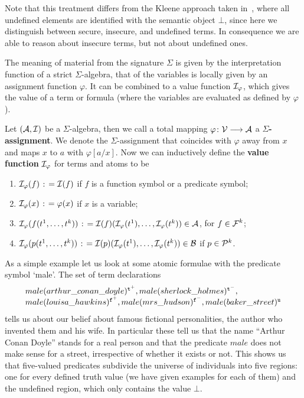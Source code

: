 \documentclass{\filespath jancl}
\def\Vars{{\cV}}                      %
\def\Funcs{{\mbox{$\cF$}}}
\def\to{\longrightarrow}
\def\deq{{\;\colon\kern-.2em=\;}}
\def\phi{\varphi}
\def\cA{{\cal A}}\def\cB{{\cal B}}\def\cC{{\cal C}}
\def\cV{{\cal V}}\def\cW{{\cal W}}\def\cX{{\cal X}}
\let\phi\varphi
\newcommand{\undefined}{{\sf u}}
\newcommand{\twts}{{{\sf t}^+}}
\newcommand{\twfs}{{{\sf f}^+}}
\newcommand{\twti}{{{\sf t}^-}}
\newcommand{\twfi}{{{\sf f}^-}}
\newcommand{\Tval}{{\cal B}}
\def\Preds{{\cal P}}
\def\sf{\tt}
\begin{document}
  Note that this treatment differs from the Kleene approach taken
  in~\cite{KeKo94}, where all undefined elements are identified
  with the semantic object $\bot$, since here we distinguish between
  secure, insecure, and undefined terms.  In consequence we are able
  to reason about insecure terms, but not about undefined ones.

The meaning of material from the signature $\Sigma$ is given by the
interpretation function of a strict $\Sigma$-algebra, that of the variables is
locally given by an assignment function $\phi$. It can be combined to
a value function $\cI_{\phi}$, which gives the value of a term or formula
(where the variables are evaluated as defined by $\phi$). 

\begin{definition}
  Let $(\cA,\cI)$ be a $\Sigma$-algebra, then we call a total mapping
  $\phi\colon\Vars\to\cA$ a {\bf $\Sigma$-assignment}. We denote the
  $\Sigma$-as\-sign\-ment that coincides with $\phi$ away from $x$ and
  maps $x$ to $a$ with $\phi[a/x]$.
  Now we can inductively define the {\bf value function} $\cI_\phi$ for terms
  and atoms to be
    \begin{enumerate}
  \item $\cI_\phi(f)\deq\cI(f)$ if $f$ is a function symbol or a predicate symbol;
  \item $\cI_\phi(x)\deq\phi(x)$ if $x$ is a variable;
  \item
    $\cI_\phi(f(t^1,\ldots,t^k))\deq\cI(f)(\cI_\phi(t^1),\ldots,\cI_\phi(t^k))\in\cA$,
    for $f\in\Funcs^k$;
  \item
    $\cI_\phi(p(t^1,\ldots,t^k))\deq\cI(p)(\cI_\phi(t^1),\ldots,\cI_\phi(t^k))\in\Tval$
    if $p\in\Preds^k$.
    \end{enumerate}
\end{definition}


\begin{example}\label{ex:literature}
  As a simple example let us look at some atomic formulae with the predicate
  symbol `male'. The set of term declarations
  \[\begin{array}{l}male(arthur\_conan\_doyle)^{\twts},male(sherlock\_holmes)^{\twti},\\
                    male(louisa\_hawkins)^{\twfs},male(mrs\_hudson)^{\twfi},male(baker\_street)^{\undefined}
  \end{array}\]
  tells us about our belief about famous fictional personalities, the
  author who invented them and his wife. In particular these tell us that the
  name ``Arthur Conan Doyle'' stands for a real person
  and that the predicate $\textit{male}$ does not make sense for a street, irrespective
  of whether it exists or not. This shows
  us that five-valued predicates subdivide the universe of individuals into
  five regions: one for every defined truth value (we have given examples for
  each of them) and the undefined region, which only contains the value $\bot$.
\end{example}
\end{document}
